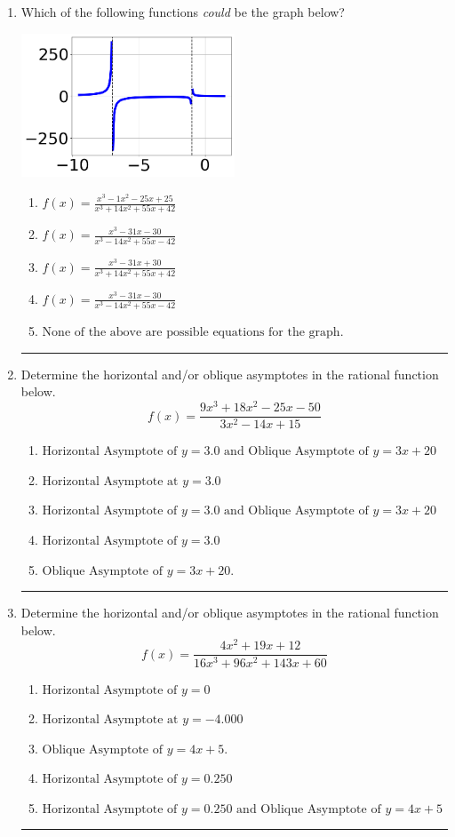 \documentclass[14pt]{extbook}
\newcommand{\litem}[1]{\item#1\hspace*{-1cm}\rule{\textwidth}{0.4pt}}
\begin{document}
\begin{enumerate}
{\begin{enumerate}[label=\Alph*.]
\end{enumerate} }
\litem{
Which of the following functions \textit{could} be the graph below?
\begin{center}
    \includegraphics[width=0.5\textwidth]{../Figures/identifyGraphOfRationalFunctionCopyB.png}
\end{center}
\begin{enumerate}[label=\Alph*.]
\item \( f(x)=\frac{x^{3} -1 x^{2} -25 x + 25}{x^{3} +14 x^{2} +55 x + 42} \)
\item \( f(x)=\frac{x^{3} -31 x -30}{x^{3} -14 x^{2} +55 x -42} \)
\item \( f(x)=\frac{x^{3} -31 x + 30}{x^{3} +14 x^{2} +55 x + 42} \)
\item \( f(x)=\frac{x^{3} -31 x -30}{x^{3} -14 x^{2} +55 x -42} \)
\item \( \text{None of the above are possible equations for the graph.} \)

\end{enumerate} }
\litem{
Determine the horizontal and/or oblique asymptotes in the rational function below.\[ f(x) = \frac{9x^{3} +18 x^{2} -25 x -50}{3x^{2} -14 x + 15} \]\begin{enumerate}[label=\Alph*.]
\item \( \text{Horizontal Asymptote of } y = 3.0 \text{ and Oblique Asymptote of } y = 3x + 20 \)
\item \( \text{Horizontal Asymptote at } y = 3.0 \)
\item \( \text{Horizontal Asymptote of } y = 3.0 \text{ and Oblique Asymptote of } y = 3x + 20 \)
\item \( \text{Horizontal Asymptote of } y = 3.0  \)
\item \( \text{Oblique Asymptote of } y = 3x + 20. \)

\end{enumerate} }
\litem{
Determine the horizontal and/or oblique asymptotes in the rational function below.\[ f(x) = \frac{4x^{2} +19 x + 12}{16x^{3} +96 x^{2} +143 x + 60} \]\begin{enumerate}[label=\Alph*.]
\item \( \text{Horizontal Asymptote of } y = 0 \)
\item \( \text{Horizontal Asymptote at } y = -4.000 \)
\item \( \text{Oblique Asymptote of } y = 4x + 5. \)
\item \( \text{Horizontal Asymptote of } y = 0.250  \)
\item \( \text{Horizontal Asymptote of } y = 0.250 \text{ and Oblique Asymptote of } y = 4x + 5 \)


\end{enumerate}}
\end{enumerate}
\end{document}
